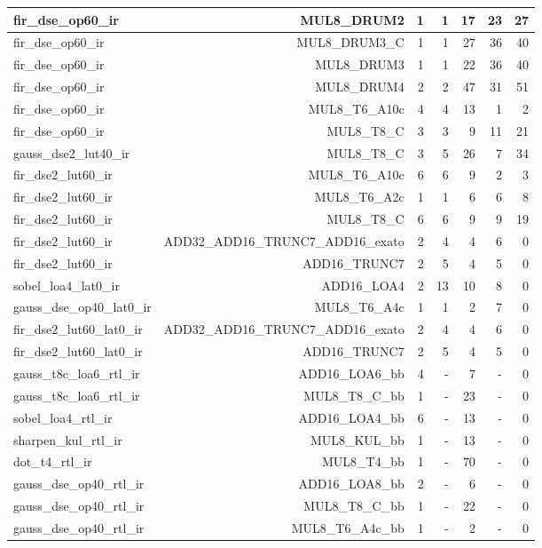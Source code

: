 \begin{table}[htbp]
\begin{tabular}{|l|r|r|r|r|r|r|}
fir\_dse\_op60\_ir & MUL8\_DRUM2 & 1 & 1 & 17 & 23 & 27 \\ \hline
fir\_dse\_op60\_ir & MUL8\_DRUM3\_C & 1 & 1 & 27 & 36 & 40 \\ \hline
fir\_dse\_op60\_ir & MUL8\_DRUM3 & 1 & 1 & 22 & 36 & 40 \\ \hline
fir\_dse\_op60\_ir & MUL8\_DRUM4 & 2 & 2 & 47 & 31 & 51 \\ \hline
fir\_dse\_op60\_ir & MUL8\_T6\_A10c & 4 & 4 & 13 & 1 & 2 \\ \hline
fir\_dse\_op60\_ir & MUL8\_T8\_C & 3 & 3 & 9 & 11 & 21 \\ \hline
gauss\_dse2\_lut40\_ir & MUL8\_T8\_C & 3 & 5 & 26 & 7 & 34 \\ \hline
fir\_dse2\_lut60\_ir & MUL8\_T6\_A10c & 6 & 6 & 9 & 2 & 3 \\ \hline
fir\_dse2\_lut60\_ir & MUL8\_T6\_A2c & 1 & 1 & 6 & 6 & 8 \\ \hline
fir\_dse2\_lut60\_ir & MUL8\_T8\_C & 6 & 6 & 9 & 9 & 19 \\ \hline
fir\_dse2\_lut60\_ir & ADD32\_ADD16\_TRUNC7\_ADD16\_exato & 2 & 4 & 4 & 6 & 0 \\ \hline
fir\_dse2\_lut60\_ir & ADD16\_TRUNC7 & 2 & 5 & 4 & 5 & 0 \\ \hline
sobel\_loa4\_lat0\_ir & ADD16\_LOA4 & 2 & 13 & 10 & 8 & 0 \\ \hline
gauss\_dse\_op40\_lat0\_ir & MUL8\_T6\_A4c & 1 & 1 & 2 & 7 & 0 \\ \hline
fir\_dse2\_lut60\_lat0\_ir & ADD32\_ADD16\_TRUNC7\_ADD16\_exato & 2 & 4 & 4 & 6 & 0 \\ \hline
fir\_dse2\_lut60\_lat0\_ir & ADD16\_TRUNC7 & 2 & 5 & 4 & 5 & 0 \\ \hline
gauss\_t8c\_loa6\_rtl\_ir & ADD16\_LOA6\_bb & 4 & - & 7 & - & 0 \\ \hline
gauss\_t8c\_loa6\_rtl\_ir & MUL8\_T8\_C\_bb & 1 & - & 23 & - & 0 \\ \hline
sobel\_loa4\_rtl\_ir & ADD16\_LOA4\_bb & 6 & - & 13 & - & 0 \\ \hline
sharpen\_kul\_rtl\_ir & MUL8\_KUL\_bb & 1 & - & 13 & - & 0 \\ \hline
dot\_t4\_rtl\_ir & MUL8\_T4\_bb & 1 & - & 70 & - & 0 \\ \hline
gauss\_dse\_op40\_rtl\_ir & ADD16\_LOA8\_bb & 2 & - & 6 & - & 0 \\ \hline
gauss\_dse\_op40\_rtl\_ir & MUL8\_T8\_C\_bb & 1 & - & 22 & - & 0 \\ \hline
gauss\_dse\_op40\_rtl\_ir & MUL8\_T6\_A4c\_bb & 1 & - & 2 & - & 0 \\ \hline

\end{tabular}
\end{table}
